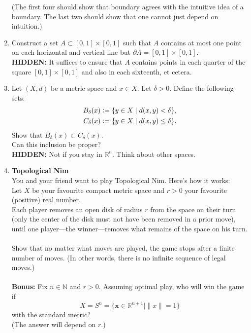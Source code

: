 \documentclass[12pt]{article}
\theoremstyle{definition}
\numberwithin{thm}{section}
\newcommand{\hint}[1]{\textbf{HIDDEN:} {\color[rgb]{0.95, 0.95, 0.95}#1}}
\begin{document}
\begin{enumerate}
\begin{enumerate}
	\end{enumerate}
	(The first four should show that boundary agrees with the intuitive idea of a boundary. The last two should show that one cannot just depend on intuition.)
	\item Construct a set $A \subset [0, 1] \times [0, 1]$ such that $A$ contains at most one point on each horizontal and vertical line but $\partial A = [0, 1] \times [0, 1].$\\
	\hint{It suffices to ensure that $A$ contains points in each quarter of the square $[0, 1] \times [0, 1]$ and also in each sixteenth, et cetera.}
	\item Let $(X, d)$ be a metric space and $x \in X.$ Let $\delta > 0.$ Define the following sets:
	\begin{align*} 
	 	B_\delta(x) &\vcentcolon= \{y \in X \mid d(x, y) < \delta\},\\
	 	C_\delta(x) &\vcentcolon= \{y \in X \mid d(x, y) \le \delta\}.
	\end{align*} 
	Show that $\overline{B_\delta(x)} \subset C_\delta(x).$\\
	Can this inclusion be proper?\\
	\hint{Not if you stay in $\mathbb{R}^n.$ Think about other spaces.}
	\item \textbf{Topological Nim}\\
	You and your friend want to play Topological Nim. Here's how it works:\\
	Let $X$ be your favourite compact metric space and $r > 0$ your favourite (positive) real number.\\
	Each player removes an open disk of radius $r$ from the space on their turn (only the center of the disk must not have been removed in a prior move), until one player—the winner—removes what remains of the space on his turn.\\~\\
	Show that no matter what moves are played, the game stops after a finite number of moves. (In other words, there is no infinite sequence of legal moves.)\\~\\
	\textbf{Bonus:} Fix $n \in \mathbb{N}$ and $r > 0.$ Assuming optimal play, who will win the game if
	\begin{equation*} 
		X = S^n = \{\mathbf{x} \in \mathbb{R}^{n+1} \mid \|x\| = 1\}
	\end{equation*}
	with the standard metric?\\
	(The answer will depend on $r$.)\\~\\

\end{enumerate}
\end{document}

